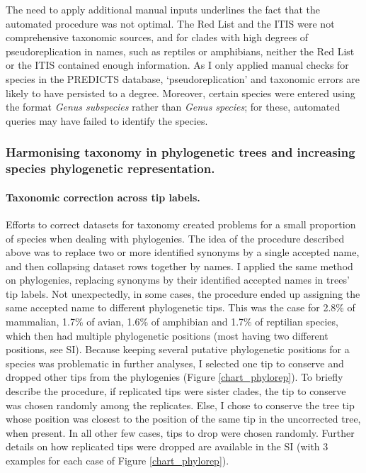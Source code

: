 The need to apply additional manual inputs underlines the fact that the automated procedure was not optimal. The Red List and the ITIS were not comprehensive taxonomic sources, and for clades with high degrees of pseudoreplication in names, such as reptiles or amphibians, neither the Red List or the ITIS contained enough information. As I only applied manual checks for species in the PREDICTS database, `pseudoreplication' and taxonomic errors are likely to have persisted to a degree. Moreover, certain species were entered using the format \textit{Genus subspecies} rather than \textit{Genus species}; for these, automated queries may have failed to identify the species.



\subsubsection{Harmonising taxonomy in phylogenetic trees and increasing species phylogenetic representation.}

\paragraph{Taxonomic correction across tip labels.} 
Efforts to correct datasets for taxonomy created problems for a small proportion of species when dealing with phylogenies. The idea of the procedure described above was to replace two or more identified synonyms by a single accepted name, and then collapsing dataset rows together by names. I applied the same method on phylogenies, replacing synonyms by their identified accepted names in trees' tip labels. Not unexpectedly, in some cases, the procedure ended up assigning the same accepted name to different phylogenetic tips. This was the case for 2.8\% of mammalian, 1.7\% of avian, 1.6\% of amphibian and  1.7\% of reptilian species, which then had multiple phylogenetic positions (most having two different positions, see SI). Because keeping several putative phylogenetic positions for a species was problematic in further analyses, I selected one tip to conserve and dropped other tips from the phylogenies (Figure \ref{chart_phylorep}). To briefly describe the procedure, if replicated tips were sister clades, the tip to conserve was chosen randomly among the replicates. Else, I chose to conserve the tree tip whose position was closest to the position of the same tip in the uncorrected tree, when present. In all other few cases, tips to drop were chosen randomly. Further details on how replicated tips were dropped are available in the SI (with 3 examples for each case of Figure \ref{chart_phylorep}).

